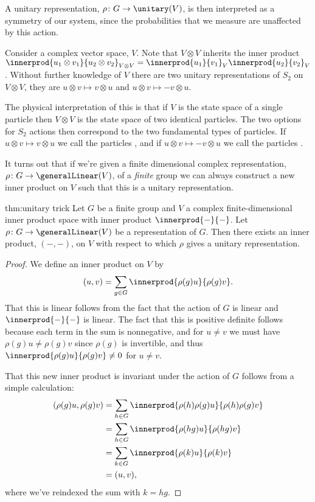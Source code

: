 A unitary representation, \(\rho \colon G \to \unitary(V)\), is then interpreted as a symmetry of our system, since the probabilities that we measure are unaffected by this action.

Consider a complex vector space, \(V\).
Note that \(V \otimes V\) inherits the inner product \(\innerprod{u_1 \otimes v_1}{u_2 \otimes v_2}_{V \otimes V} = \innerprod{u_1}{v_1}_V \innerprod{u_2}{v_2}_V\).
Without further knowledge of \(V\) there are two unitary representations of \(S_2\) on \(V \otimes V\), they are \(u \otimes v \mapsto v \otimes u\) and \(u \otimes v \mapsto -v \otimes u\).

The physical interpretation of this is that if \(V\) is the state space of a single particle then \(V \otimes V\) is the state space of two identical particles.
The two options for \(S_2\) actions then correspond to the two fundamental types of particles.
If \(u \otimes v \mapsto v \otimes u\) we call the particles , and if \(u \otimes v \mapsto -v \otimes u\) we call the particles .

It turns out that if we're given a finite dimensional complex representation, \(\rho \colon G \to \generalLinear(V)\), of a \emph{finite} group we can always construct a new inner product on \(V\) such that this is a unitary representation.

\begin{thm}{}{thm:unitary trick}
    Let \(G\) be a finite group and \(V\) a complex finite-dimensional inner product space with inner product \(\innerprod{-}{-}\).
    Let \(\rho \colon G \to \generalLinear(V)\) be a representation of \(G\).
    Then there exists an inner product, \((-,-)\), on \(V\) with respect to which \(\rho\) gives a unitary representation.
    \begin{proof}
        We define an inner product on \(V\) by
        \begin{equation}
            (u, v) = \sum_{g \in G} \innerprod{\rho(g)u}{\rho(g)v}.
        \end{equation}
        That this is linear follows from the fact that the action of \(G\) is linear and \(\innerprod{-}{-}\) is linear.
        The fact that this is positive definite follows because each term in the sum is nonnegative, and for \(u \ne v\) we must have \(\rho(g)u \ne \rho(g)v\) since \(\rho(g)\) is invertible, and thus \(\innerprod{\rho(g)u}{\rho(g)v} \ne 0\) for \(u \ne v\).
        
        That this new inner product is invariant under the action of \(G\) follows from a simple calculation:
        \begin{align}
            (\rho(g)u, \rho(g)v) &= \sum_{h \in G} \innerprod{\rho(h)\rho(g)u}{\rho(h)\rho(g)v}\\
            &= \sum_{h \in G} \innerprod{\rho(hg)u}{\rho(hg)v}\\
            &= \sum_{k \in G} \innerprod{\rho(k)u}{\rho(k)v}\\
            &= (u, v),
        \end{align}
        where we've reindexed the sum with \(k = hg\).
    \end{proof}
\end{thm}

